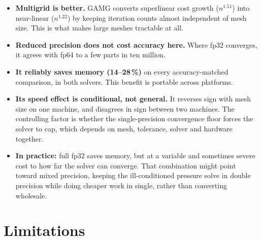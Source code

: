 \documentclass[10pt,twocolumn]{article}
\begin{document}
\begin{itemize}
  \item \textbf{Multigrid is better.} GAMG converts superlinear cost
  growth ($n^{1.51}$) into near-linear ($n^{1.22}$) by keeping iteration counts
  almost independent of mesh size. This is what makes large meshes tractable at
  all.
  \item \textbf{Reduced precision does not cost accuracy here.} Where fp32
  converges, it agrees with fp64 to a few parts in ten million.
  \item \textbf{It reliably saves memory (14--28\,\%)} on every
  accuracy-matched comparison, in both solvers. This benefit is portable across
  platforms.
  \item \textbf{Its speed effect is conditional, not general.} It reverses sign
  with mesh size on one machine, and disagrees in sign between two machines. The
  controlling factor is whether the single-precision convergence floor forces
  the solver to cap, which depends on mesh, tolerance, solver and hardware
  together.
  \item \textbf{In practice:} full fp32 saves memory, but at a variable and
  sometimes severe cost to how far the solver can converge. That combination might point
  toward mixed precision, keeping the ill-conditioned pressure solve
  in double precision while doing cheaper work in single, rather than
  converting wholesale.
\end{itemize}

\section{Limitations}
\end{document}
